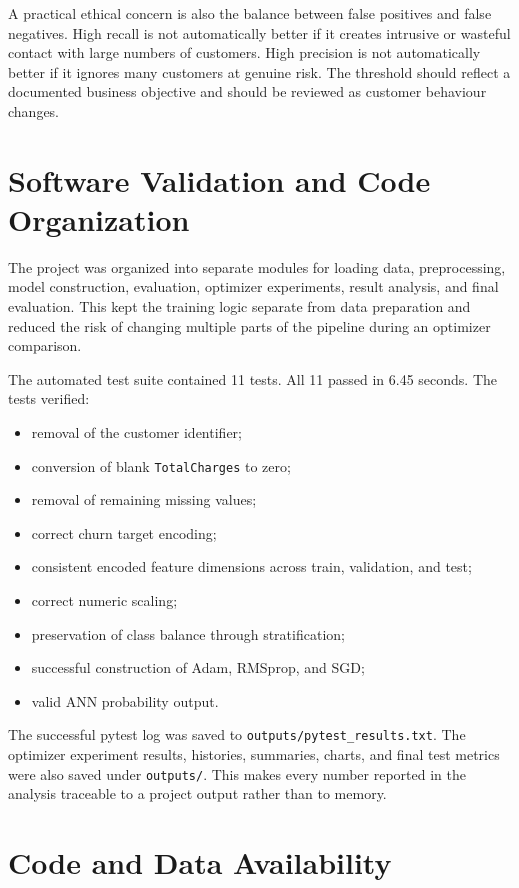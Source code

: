 \documentclass[11pt]{article}
\begin{document}
A practical ethical concern is also the balance between false positives and false negatives. High recall is not automatically better if it creates intrusive or wasteful contact with large numbers of customers. High precision is not automatically better if it ignores many customers at genuine risk. The threshold should reflect a documented business objective and should be reviewed as customer behaviour changes.

\section{Software Validation and Code Organization}

The project was organized into separate modules for loading data, preprocessing, model construction, evaluation, optimizer experiments, result analysis, and final evaluation. This kept the training logic separate from data preparation and reduced the risk of changing multiple parts of the pipeline during an optimizer comparison.

The automated test suite contained 11 tests. All 11 passed in 6.45 seconds. The tests verified:

\begin{itemize}[leftmargin=*]
    \item removal of the customer identifier;
    \item conversion of blank \texttt{TotalCharges} to zero;
    \item removal of remaining missing values;
    \item correct churn target encoding;
    \item consistent encoded feature dimensions across train, validation, and test;
    \item correct numeric scaling;
    \item preservation of class balance through stratification;
    \item successful construction of Adam, RMSprop, and SGD;
    \item valid ANN probability output.
\end{itemize}

The successful pytest log was saved to \texttt{outputs/pytest\_results.txt}. The optimizer experiment results, histories, summaries, charts, and final test metrics were also saved under \texttt{outputs/}. This makes every number reported in the analysis traceable to a project output rather than to memory.

\section*{Code and Data Availability}
\end{document}
